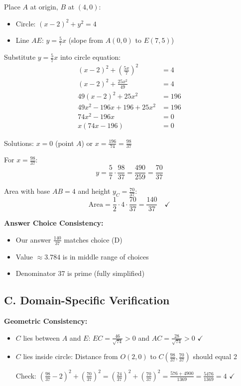 \documentclass[]{article}
\begin{document}
\begin{verificationbox}
Place $A$ at origin, $B$ at $(4, 0)$:
\begin{itemize}
    \item Circle: $(x-2)^2 + y^2 = 4$
    \item Line $AE$: $y = \frac{5}{7}x$ (slope from $A(0,0)$ to $E(7,5)$)
\end{itemize}

Substitute $y = \frac{5}{7}x$ into circle equation:
\begin{align*}
(x-2)^2 + \left(\frac{5x}{7}\right)^2 &= 4\\
(x-2)^2 + \frac{25x^2}{49} &= 4\\
49(x-2)^2 + 25x^2 &= 196\\
49x^2 - 196x + 196 + 25x^2 &= 196\\
74x^2 - 196x &= 0\\
x(74x - 196) &= 0
\end{align*}

Solutions: $x = 0$ (point $A$) or $x = \frac{196}{74} = \frac{98}{37}$

For $x = \frac{98}{37}$:
\[y = \frac{5}{7} \cdot \frac{98}{37} = \frac{490}{259} = \frac{70}{37}\]

Area with base $AB = 4$ and height $y_C = \frac{70}{37}$:
\[\text{Area} = \frac{1}{2} \cdot 4 \cdot \frac{70}{37} = \frac{140}{37} \quad \checkmark\]

\textbf{Answer Choice Consistency:}
\begin{itemize}[leftmargin=*]
    \item Our answer $\frac{140}{37}$ matches choice (D)
    \item Value $\approx 3.784$ is in middle range of choices
    \item Denominator 37 is prime (fully simplified)
\end{itemize}

\subsection*{C. Domain-Specific Verification}

\textbf{Geometric Consistency:}
\begin{itemize}[leftmargin=*]
    \item $C$ lies between $A$ and $E$: $EC = \frac{46}{\sqrt{74}} > 0$ and $AC = \frac{28}{\sqrt{74}} > 0$ $\checkmark$
    \item $C$ lies inside circle: Distance from $O(2,0)$ to $C(\frac{98}{37}, \frac{70}{37})$ should equal 2

    Check: $\left(\frac{98}{37} - 2\right)^2 + \left(\frac{70}{37}\right)^2 = \left(\frac{24}{37}\right)^2 + \left(\frac{70}{37}\right)^2 = \frac{576 + 4900}{1369} = \frac{5476}{1369} = 4$ $\checkmark$
    

\end{itemize}
\end{verificationbox}
\end{document}
